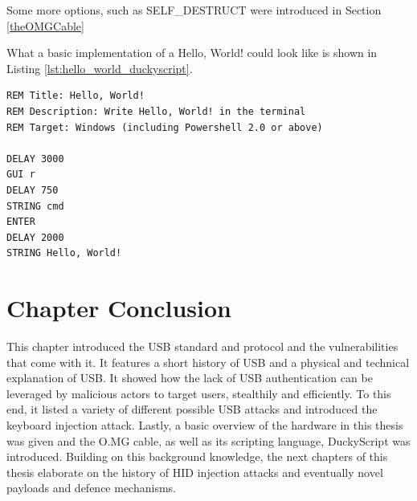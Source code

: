 Some more options, such as SELF\_DESTRUCT were introduced in Section \ref{theOMGCable}

What a basic implementation of a Hello, World! could look like is shown in Listing \ref{lst:hello_world_duckyscript}.

\begin{lstlisting}[caption={Hello, World! in DuckyScript 1.0}, label={lst:hello_world_duckyscript}, captionpos=b]
REM Title: Hello, World!
REM Description: Write Hello, World! in the terminal
REM Target: Windows (including Powershell 2.0 or above)

DELAY 3000
GUI r
DELAY 750
STRING cmd
ENTER
DELAY 2000
STRING Hello, World!
\end{lstlisting}



\section{Chapter Conclusion}

This chapter introduced the USB standard and protocol and the vulnerabilities that come with it. It features a short history of USB and a physical and technical explanation of USB. It showed how the lack of USB authentication can be leveraged by malicious actors to target users, stealthily and efficiently. To this end, it listed a variety of different possible USB attacks and introduced the keyboard injection attack.
Lastly, a basic overview of the hardware in this thesis was given and the O.MG cable, as well as its scripting language, DuckyScript was introduced. 
Building on this background knowledge, the next chapters of this thesis elaborate on the history of HID injection attacks and eventually novel payloads and defence mechanisms. 